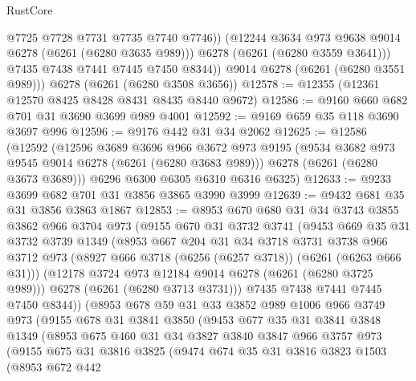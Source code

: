 \begin{lexlean}{RustCore}
\begin{coremodule}
                @7725
                @7728
                @7731
                @7735
                @7740
                @7746))
            (@12244 @3634 @973 @9638 @9014 @6278 (@6261 (@6280 @3635 @989)))
            @6278
            (@6261 (@6280 @3559 @3641)))
          @7435
          @7438
          @7441
          @7445
          @7450
          @8344))
      @9014
      @6278
      (@6261 (@6280 @3551 @989)))
    @6278
    (@6261 (@6280 @3508 @3656))
@12578 := @12355 (@12361 @12570 @8425 @8428 @8431 @8435 @8440 @9672)
@12586 := @9160 @660 @682 @701 @31 @3690 @3699 @989 @4001
@12592 := @9169 @659 @35 @118 @3690 @3697 @996
@12596 := @9176 @442 @31 @34 @2062
@12625 := @12586
    (@12592
      (@12596
        @3689
        @3696
        @966
        @3672
        @973
        @9195
        (@9534 @3682 @973 @9545 @9014 @6278 (@6261 (@6280 @3683 @989)))
        @6278
        (@6261 (@6280 @3673 @3689)))
      @6296
      @6300
      @6305
      @6310
      @6316
      @6325)
@12633 := @9233 @3699 @682 @701 @31 @3856 @3865 @3990 @3999
@12639 := @9432 @681 @35 @31 @3856 @3863 @1867
@12853 := @8953
    @670
    @680
    @31
    @34
    @3743
    @3855
    @3862
    @966
    @3704
    @973
    (@9155
      @670
      @31
      @3732
      @3741
      (@9453
        @669
        @35
        @31
        @3732
        @3739
        @1349
        (@8953
          @667
          @204
          @31
          @34
          @3718
          @3731
          @3738
          @966
          @3712
          @973
          (@8927 @666 @3718 (@6256 (@6257 @3718)) (@6261 (@6263 @666 @31)))
          (@12178 @3724 @973 @12184 @9014 @6278 (@6261 (@6280 @3725 @989)))
          @6278
          (@6261 (@6280 @3713 @3731)))
        @7435
        @7438
        @7441
        @7445
        @7450
        @8344))
    (@8953
      @678
      @59
      @31
      @33
      @3852
      @989
      @1006
      @966
      @3749
      @973
      (@9155
        @678
        @31
        @3841
        @3850
        (@9453
          @677
          @35
          @31
          @3841
          @3848
          @1349
          (@8953
            @675
            @460
            @31
            @34
            @3827
            @3840
            @3847
            @966
            @3757
            @973
            (@9155
              @675
              @31
              @3816
              @3825
              (@9474
                @674
                @35
                @31
                @3816
                @3823
                @1503
                (@8953
                  @672
                  @442

\end{coremodule}
\end{lexlean}
